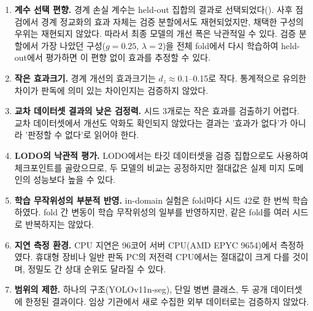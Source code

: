 \begin{enumerate}
  \item \textbf{계수 선택 편향.} 경계 손실 계수는 held-out 집합의 결과로 선택되었다(). 사후 점검에서
    경계 정교화의 효과 자체는 검증 분할에서도 재현되었지만, 채택한 구성의 우위는 재현되지 않았다. 따라서 최종 모델의
    개선 폭은 낙관적일 수 있다. 검증 분할에서 가장 나았던 구성($g=0.25$, $\lambda=2$)을 전체 fold에서 다시 학습하여
    held-out에서 평가하면 이 편향 없이 효과를 추정할 수 있다.
  \item \textbf{작은 효과크기.} 경계 개선의 효과크기는 $d_z\approx0.1$--0.15로 작다. 통계적으로 유의한 차이가
    판독에 의미 있는 차이인지는 검증하지 않았다.
  \item \textbf{교차 데이터셋 결과의 낮은 검정력.} 시드 3개로는 작은 효과를 검출하기 어렵다. 교차 데이터셋에서
    개선도 악화도 확인되지 않았다는 결과는 '효과가 없다'가 아니라 '판정할 수 없다'로 읽어야 한다.
  \item \textbf{LODO의 낙관적 평가.} LODO에서는 타깃 데이터셋을 검증 집합으로도 사용하여 체크포인트를 골랐으므로,
    두 모델의 비교는 공정하지만 절대값은 실제 미지 도메인의 성능보다 높을 수 있다.
  \item \textbf{학습 무작위성의 부분적 반영.} in-domain 실험은 fold마다 시드 42로 한 번씩 학습하였다. fold 간 변동이
    학습 무작위성의 일부를 반영하지만, 같은 fold를 여러 시드로 반복하지는 않았다.
  \item \textbf{지연 측정 환경.} CPU 지연은 96코어 서버 CPU(AMD EPYC 9654)에서 측정하였다. 휴대형 장비나 일반 판독 PC의
    저전력 CPU에서는 절대값이 크게 다를 것이며, 정밀도 간 상대 순위도 달라질 수 있다.
  \item \textbf{범위의 제한.} 하나의 구조(YOLOv11n-seg), 단일 병변 클래스, 두 공개 데이터셋에 한정된 결과이다.
    임상 기관에서 새로 수집한 외부 데이터로는 검증하지 않았다.
\end{enumerate}
